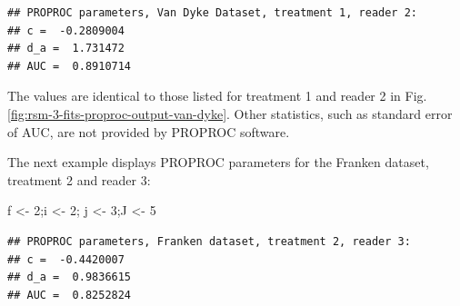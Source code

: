\documentclass[
]{book}
\newenvironment{Shaded}{\begin{snugshade}}{\end{snugshade}}
\newcommand{\DecValTok}[1]{\textcolor[rgb]{0.00,0.00,0.81}{#1}}
\newcommand{\FunctionTok}[1]{\textcolor[rgb]{0.00,0.00,0.00}{#1}}
\newcommand{\NormalTok}[1]{#1}
\newcommand{\OtherTok}[1]{\textcolor[rgb]{0.56,0.35,0.01}{#1}}
\newcommand{\SpecialCharTok}[1]{\textcolor[rgb]{0.00,0.00,0.00}{#1}}
\newcommand{\StringTok}[1]{\textcolor[rgb]{0.31,0.60,0.02}{#1}}
\begin{document}
\begin{Shaded}
\end{Shaded}

\begin{verbatim}
## PROPROC parameters, Van Dyke Dataset, treatment 1, reader 2: 
## c =  -0.2809004 
## d_a =  1.731472 
## AUC =  0.8910714
\end{verbatim}

The values are identical to those listed for treatment 1 and reader 2 in Fig. \ref{fig:rsm-3-fits-proproc-output-van-dyke}. Other statistics, such as standard error of AUC, are not provided by PROPROC software.

The next example displays PROPROC parameters for the Franken dataset, treatment 2 and reader 3:

\begin{Shaded}
\begin{Highlighting}[]
\NormalTok{f }\OtherTok{\textless{}{-}} \DecValTok{2}\NormalTok{;i }\OtherTok{\textless{}{-}} \DecValTok{2}\NormalTok{; j }\OtherTok{\textless{}{-}} \DecValTok{3}\NormalTok{;J }\OtherTok{\textless{}{-}} \DecValTok{5}
\end{Highlighting}
\end{Shaded}

\begin{verbatim}
## PROPROC parameters, Franken dataset, treatment 2, reader 3: 
## c =  -0.4420007 
## d_a =  0.9836615 
## AUC =  0.8252824
\end{verbatim}
\end{document}
